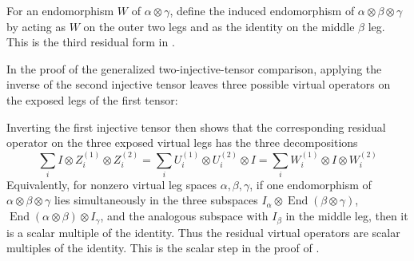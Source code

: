 \begin{definition}%
    \label{def:peps_threeLegMiddleIdentityForm}
    \leanok
    For an endomorphism $W$ of $\alpha\otimes\gamma$, define the induced
    endomorphism of $\alpha\otimes\beta\otimes\gamma$ by acting as $W$ on the
    outer two legs and as the identity on the middle $\beta$ leg. This is the
    third residual form in \cite[Section~3]{Molnar2018NormalPEPS}.
\end{definition}

\begin{theorem}%
    \label{thm:peps_twoInjectiveGaugeScalarReduction}
    \leanok
    In the proof of the generalized two-injective-tensor comparison, applying
    the inverse of the second injective tensor leaves three possible virtual
    operators on the exposed legs of the first tensor:
    \begin{center}
        \TNPEPSTwoInjectiveGaugeScalarReduction
    \end{center}
    Inverting the first injective tensor then shows that the corresponding
    residual operator on the three exposed virtual legs has the three
    decompositions
    \[
        \sum_i I\otimes Z_i^{(1)}\otimes Z_i^{(2)}
        =
        \sum_i U_i^{(1)}\otimes U_i^{(2)}\otimes I
        =
        \sum_i W_i^{(1)}\otimes I\otimes W_i^{(2)}
    \]
    Equivalently, for nonzero virtual leg spaces $\alpha,\beta,\gamma$, if one
    endomorphism of $\alpha\otimes\beta\otimes\gamma$ lies simultaneously in
    the three subspaces $I_\alpha\otimes \operatorname{End}(\beta\otimes\gamma)$,
    $\operatorname{End}(\alpha\otimes\beta)\otimes I_\gamma$, and the analogous
    subspace with $I_\beta$ in the middle leg, then it is a scalar multiple of
    the identity. Thus the residual virtual operators are scalar multiples of
    the identity. This is the scalar step in the proof of
    \cite[Section~3]{Molnar2018NormalPEPS}.
\end{theorem}
